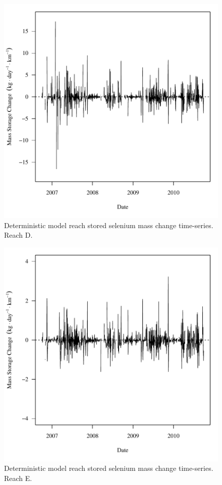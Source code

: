 \begin{figure}[htbp]
	\begin{center}
	\includegraphics[width=6in]{"Figures/Results_DUSR/f Segment D"}
	\caption{Deterministic model reach stored selenium mass change time-series.  Reach D.}
	\end{center}
\end{figure}
\newpage

\begin{figure}[htbp]
	\begin{center}
	\includegraphics[width=6in]{"Figures/Results_DUSR/f Segment E"}
	\caption{Deterministic model reach stored selenium mass change time-series.  Reach E.}
	\end{center}
\end{figure}
\newpage

